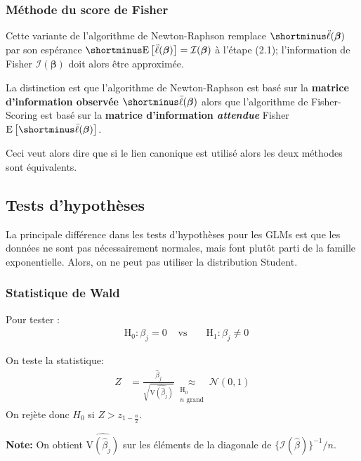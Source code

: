 \documentclass[10pt, french]{article}
\begin{document}
\begin{multicols*}{3}
\subsubsection*{Méthode du score de Fisher}

Cette variante de l'algorithme de Newton-Raphson remplace $\shortminus\ddot{\ell}(\bm{\beta})$ par son espérance $\shortminus\esp{\ddot{\ell}(\bm{\beta})} = \mathcal{I}(\bm{\beta})$ à l'étape (2.1); l'information de Fisher $\mathcal{I}(\bm{\beta})$ doit alors être approximée.

La distinction est que l'algorithme de Newton-Raphson est basé sur la \textbf{matrice d'information observée} $\shortminus\ddot{\ell}(\bm{\beta})$ alors que l'algorithme de Fisher-Scoring est basé sur la \textbf{matrice d'information \textit{attendue}} Fisher $\esp{\shortminus\ddot{\ell}(\bm{\beta})}$.

Ceci veut alors dire que si le lien canonique est utilisé alors les deux méthodes sont équivalents.

\subsection*{Tests d'hypothèses}

La principale différence dans les tests d'hypothèses pour les GLMs est que les données ne sont pas nécessairement normales, mais font plutôt parti de la famille exponentielle. Alors, on ne peut pas utiliser la distribution Student.

\subsubsection*{Statistique de Wald}

Pour tester :
\begin{align*}
	&\textrm{H}_{0}: \beta_{j} = 0 &
	\text{ vs } &
	&\textrm{H}_{1}: \beta_{j} \neq 0 
\end{align*} 

On teste la statistique:
\begin{align*}
	Z 
	&= 	\frac{\hat{\beta}_j}{\sqrt{\widehat{\text{V}(\hat{\beta}_j)}}} \underset{\substack{\textrm{H}_0 \\ n \text{ grand} }}{\approx} \mathcal{N}(0,1) 
\end{align*}
On rejète donc $H_0$ si $Z > z_{1 - \frac{\alpha}{2}}$.

\textbf{Note: } On obtient $\widehat{\text{V}(\hat{\beta}_j)}$ sur les éléments de la diagonale de $\{ \mathcal{I}(\hat{\beta}) \}^{-1} / n$.


\end{multicols*}
\end{document}
